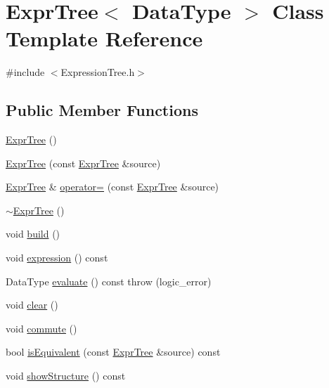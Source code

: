 \hypertarget{class_expr_tree}{\section{Expr\-Tree$<$ Data\-Type $>$ Class Template Reference}
\label{class_expr_tree}
}


{\ttfamily \#include $<$Expression\-Tree.\-h$>$}

\subsection*{Public Member Functions}
\begin{DoxyCompactItemize}
\item 
\hyperlink{class_expr_tree_a9336ce90bcb807499172d184729f46a7}{Expr\-Tree} ()
\item 
\hyperlink{class_expr_tree_aeec9dc6139cf32fcc911840bab438239}{Expr\-Tree} (const \hyperlink{class_expr_tree}{Expr\-Tree} \&source)
\item 
\hyperlink{class_expr_tree}{Expr\-Tree} \& \hyperlink{class_expr_tree_a9a7b2120af2c2df666b1154eec20008a}{operator=} (const \hyperlink{class_expr_tree}{Expr\-Tree} \&source)
\item 
\hyperlink{class_expr_tree_a8976e9af7e1209b9db475b863ab9f31d}{$\sim$\-Expr\-Tree} ()
\item 
void \hyperlink{class_expr_tree_a283a61049eb163f6f370d562cc92c824}{build} ()
\item 
void \hyperlink{class_expr_tree_ac367645dc4ccaf488e121cd5a0a8c07d}{expression} () const 
\item 
Data\-Type \hyperlink{class_expr_tree_ad1579e64d55cdfcd500a634ef69ed792}{evaluate} () const   throw (logic\-\_\-error)
\item 
void \hyperlink{class_expr_tree_a87d6593a3ad6199b5521f6d1e3ba851f}{clear} ()
\item 
void \hyperlink{class_expr_tree_a8bfcf0da6dfd93f4228a35cded704fb4}{commute} ()
\item 
bool \hyperlink{class_expr_tree_ae64a4e3b5008fa2f533fd7461ead2485}{is\-Equivalent} (const \hyperlink{class_expr_tree}{Expr\-Tree} \&source) const 
\item 
void \hyperlink{class_expr_tree_a6f4c5e2ae8224fb53fb893231814e6d9}{show\-Structure} () const 
\end{DoxyCompactItemize}


